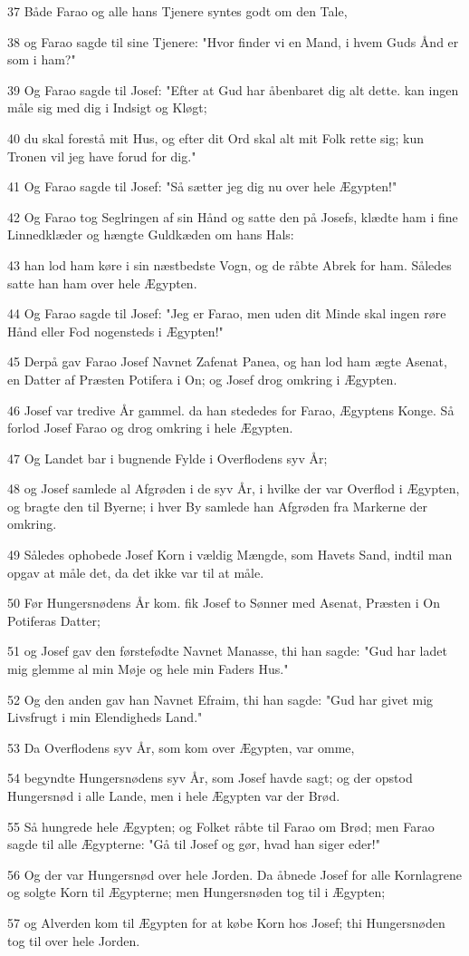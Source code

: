 \par 37 Både Farao og alle hans Tjenere syntes godt om den Tale,
\par 38 og Farao sagde til sine Tjenere: "Hvor finder vi en Mand, i hvem Guds Ånd er som i ham?"
\par 39 Og Farao sagde til Josef: "Efter at Gud har åbenbaret dig alt dette. kan ingen måle sig med dig i Indsigt og Kløgt;
\par 40 du skal forestå mit Hus, og efter dit Ord skal alt mit Folk rette sig; kun Tronen vil jeg have forud for dig."
\par 41 Og Farao sagde til Josef: "Så sætter jeg dig nu over hele Ægypten!"
\par 42 Og Farao tog Seglringen af sin Hånd og satte den på Josefs, klædte ham i fine Linnedklæder og hængte Guldkæden om hans Hals:
\par 43 han lod ham køre i sin næstbedste Vogn, og de råbte Abrek for ham. Således satte han ham over hele Ægypten.
\par 44 Og Farao sagde til Josef: "Jeg er Farao, men uden dit Minde skal ingen røre Hånd eller Fod nogensteds i Ægypten!"
\par 45 Derpå gav Farao Josef Navnet Zafenat Panea, og han lod ham ægte Asenat, en Datter af Præsten Potifera i On; og Josef drog omkring i Ægypten.
\par 46 Josef var tredive År gammel. da han stededes for Farao, Ægyptens Konge. Så forlod Josef Farao og drog omkring i hele Ægypten.
\par 47 Og Landet bar i bugnende Fylde i Overflodens syv År;
\par 48 og Josef samlede al Afgrøden i de syv År, i hvilke der var Overflod i Ægypten, og bragte den til Byerne; i hver By samlede han Afgrøden fra Markerne der omkring.
\par 49 Således ophobede Josef Korn i vældig Mængde, som Havets Sand, indtil man opgav at måle det, da det ikke var til at måle.
\par 50 Før Hungersnødens År kom. fik Josef to Sønner med Asenat, Præsten i On Potiferas Datter;
\par 51 og Josef gav den førstefødte Navnet Manasse, thi han sagde: "Gud har ladet mig glemme al min Møje og hele min Faders Hus."
\par 52 Og den anden gav han Navnet Efraim, thi han sagde: "Gud har givet mig Livsfrugt i min Elendigheds Land."
\par 53 Da Overflodens syv År, som kom over Ægypten, var omme,
\par 54 begyndte Hungersnødens syv År, som Josef havde sagt; og der opstod Hungersnød i alle Lande, men i hele Ægypten var der Brød.
\par 55 Så hungrede hele Ægypten; og Folket råbte til Farao om Brød; men Farao sagde til alle Ægypterne: "Gå til Josef og gør, hvad han siger eder!"
\par 56 Og der var Hungersnød over hele Jorden. Da åbnede Josef for alle Kornlagrene og solgte Korn til Ægypterne; men Hungersnøden tog til i Ægypten;
\par 57 og Alverden kom til Ægypten for at købe Korn hos Josef; thi Hungersnøden tog til over hele Jorden.

